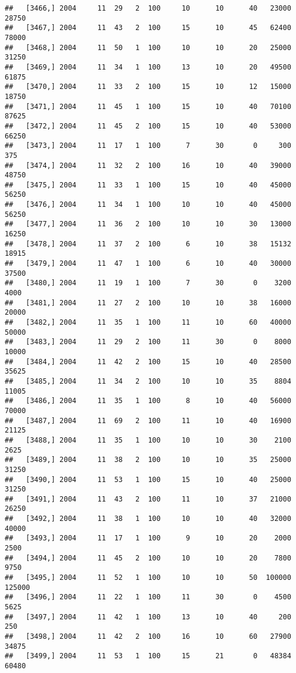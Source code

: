 \documentclass{article}\usepackage[]{graphicx}\usepackage[]{color}
\makeatletter
\newenvironment{kframe}{%
 \def\at@end@of@kframe{}%
 \ifinner\ifhmode%
  \def\at@end@of@kframe{\end{minipage}}%
  \begin{minipage}{\columnwidth}%
 \fi\fi%
 \def\FrameCommand##1{\hskip\@totalleftmargin \hskip-\fboxsep
 \colorbox{shadecolor}{##1}\hskip-\fboxsep
     \hskip-\linewidth \hskip-\@totalleftmargin \hskip\columnwidth}%
 \MakeFramed {\advance\hsize-\width
   \@totalleftmargin\z@ \linewidth\hsize
   \@setminipage}}%
 {\par\unskip\endMakeFramed%
 \at@end@of@kframe}
\newenvironment{knitrout}{}{} %
\makeatother
\begin{document}
\begin{knitrout}
\begin{kframe}
\begin{verbatim}
##   [3466,] 2004     11  29   2  100     10      10      40   23000   28750
##   [3467,] 2004     11  43   2  100     15      10      45   62400   78000
##   [3468,] 2004     11  50   1  100     10      10      20   25000   31250
##   [3469,] 2004     11  34   1  100     13      10      20   49500   61875
##   [3470,] 2004     11  33   2  100     15      10      12   15000   18750
##   [3471,] 2004     11  45   1  100     15      10      40   70100   87625
##   [3472,] 2004     11  45   2  100     15      10      40   53000   66250
##   [3473,] 2004     11  17   1  100      7      30       0     300     375
##   [3474,] 2004     11  32   2  100     16      10      40   39000   48750
##   [3475,] 2004     11  33   1  100     15      10      40   45000   56250
##   [3476,] 2004     11  34   1  100     10      10      40   45000   56250
##   [3477,] 2004     11  36   2  100     10      10      30   13000   16250
##   [3478,] 2004     11  37   2  100      6      10      38   15132   18915
##   [3479,] 2004     11  47   1  100      6      10      40   30000   37500
##   [3480,] 2004     11  19   1  100      7      30       0    3200    4000
##   [3481,] 2004     11  27   2  100     10      10      38   16000   20000
##   [3482,] 2004     11  35   1  100     11      10      60   40000   50000
##   [3483,] 2004     11  29   2  100     11      30       0    8000   10000
##   [3484,] 2004     11  42   2  100     15      10      40   28500   35625
##   [3485,] 2004     11  34   2  100     10      10      35    8804   11005
##   [3486,] 2004     11  35   1  100      8      10      40   56000   70000
##   [3487,] 2004     11  69   2  100     11      10      40   16900   21125
##   [3488,] 2004     11  35   1  100     10      10      30    2100    2625
##   [3489,] 2004     11  38   2  100     10      10      35   25000   31250
##   [3490,] 2004     11  53   1  100     15      10      40   25000   31250
##   [3491,] 2004     11  43   2  100     11      10      37   21000   26250
##   [3492,] 2004     11  38   1  100     10      10      40   32000   40000
##   [3493,] 2004     11  17   1  100      9      10      20    2000    2500
##   [3494,] 2004     11  45   2  100     10      10      20    7800    9750
##   [3495,] 2004     11  52   1  100     10      10      50  100000  125000
##   [3496,] 2004     11  22   1  100     11      30       0    4500    5625
##   [3497,] 2004     11  42   1  100     13      10      40     200     250
##   [3498,] 2004     11  42   2  100     16      10      60   27900   34875
##   [3499,] 2004     11  53   1  100     15      21       0   48384   60480

\end{verbatim}
\end{kframe}
\end{knitrout}
\end{document}
